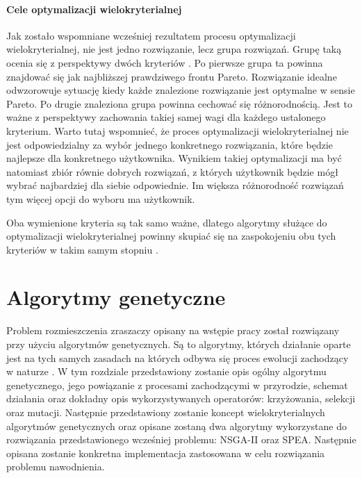 \documentclass[twoside]{iisthesis}
\begin{document}
\subsubsection{Cele optymalizacji wielokryterialnej}
Jak zostało wspomniane wcześniej rezultatem procesu optymalizacji wielokryterialnej, nie jest jedno rozwiązanie, lecz grupa rozwiązań. Grupę taką ocenia się z perspektywy dwóch kryteriów \cite{book}. Po pierwsze grupa ta powinna znajdować się jak najbliższej prawdziwego frontu Pareto. Rozwiązanie idealne odwzorowuje sytuację kiedy każde znalezione rozwiązanie jest optymalne w sensie Pareto. Po drugie znaleziona grupa powinna cechować się różnorodnością. Jest to ważne z perspektywy zachowania takiej samej wagi dla każdego ustalonego kryterium. Warto tutaj wspomnieć, że proces optymalizacji wielokryterialnej nie jest odpowiedzialny za wybór jednego konkretnego rozwiązania, które będzie najlepsze dla konkretnego użytkownika. Wynikiem takiej optymalizacji ma być natomiast zbiór równie dobrych rozwiązań, z których użytkownik będzie mógł wybrać najbardziej dla siebie odpowiednie. Im większa różnorodność rozwiązań tym więcej opcji do wyboru ma użytkownik.

Oba wymienione kryteria są tak samo ważne, dlatego algorytmy służące do optymalizacji wielokryterialnej powinny skupiać się na zaspokojeniu obu tych kryteriów w takim samym stopniu \cite{book}.

\chapter{Algorytmy genetyczne}
Problem rozmieszczenia zraszaczy opisany na wstępie pracy został rozwiązany przy użyciu algorytmów genetycznych. Są to algorytmy, których działanie oparte jest na tych samych zasadach na których odbywa się proces ewolucji zachodzący w naturze \cite{ga_book}. W tym rozdziale przedstawiony zostanie opis ogólny algorytmu genetycznego, jego powiązanie z procesami zachodzącymi w przyrodzie, schemat działania oraz dokładny opis wykorzystywanych operatorów: krzyżowania, selekcji oraz mutacji. Następnie przedstawiony zostanie koncept wielokryterialnych algorytmów genetycznych oraz opisane zostaną dwa algorytmy wykorzystane do rozwiązania przedstawionego wcześniej problemu: NSGA-II oraz SPEA. Następnie opisana zostanie konkretna implementacja zastosowana w celu rozwiązania problemu nawodnienia.
\end{document}

